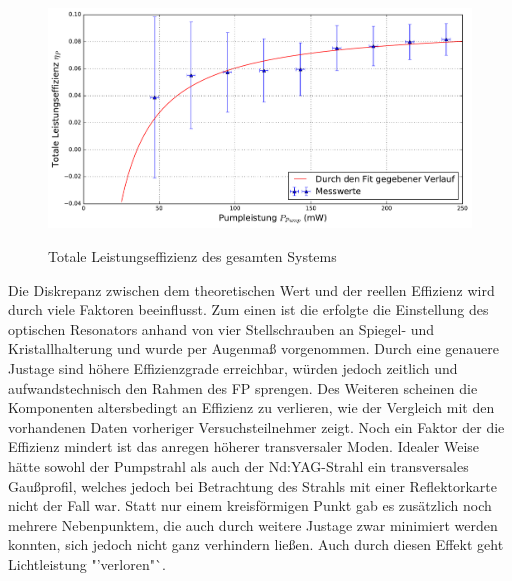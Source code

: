 \documentclass[twoside,colorback,accentcolor=tud4c,11pt]{tudreport}
\begin{document}
\begin{figure}[H]
\centering
   	\begin{minipage}[b]{0.9\textwidth}
   	\includegraphics[width=\textwidth]{graphics/tot_leisteff.pdf}
  	\label{toleist}
   	\end{minipage}
\caption{Totale Leistungseffizienz des gesamten Systems}	
\end{figure}
Die Diskrepanz zwischen dem theoretischen Wert und der reellen Effizienz wird durch viele Faktoren beeinflusst. Zum einen ist die erfolgte die Einstellung des optischen Resonators anhand von vier Stellschrauben an Spiegel- und Kristallhalterung und wurde per Augenmaß vorgenommen. Durch eine genauere Justage sind höhere Effizienzgrade erreichbar, würden jedoch zeitlich und aufwandstechnisch den Rahmen des FP sprengen. Des Weiteren scheinen die Komponenten altersbedingt an Effizienz zu verlieren, wie der Vergleich mit den vorhandenen Daten vorheriger Versuchsteilnehmer zeigt. Noch ein Faktor der die Effizienz mindert ist das anregen höherer transversaler Moden. Idealer Weise hätte sowohl der Pumpstrahl als auch der Nd:YAG-Strahl ein transversales Gaußprofil, welches jedoch bei Betrachtung des Strahls mit einer Reflektorkarte nicht der Fall war. Statt nur einem kreisförmigen Punkt gab es zusätzlich noch mehrere Nebenpunktem, die auch durch weitere Justage zwar minimiert werden konnten, sich jedoch nicht ganz verhindern ließen. Auch durch diesen Effekt geht Lichtleistung "'verloren"`.
\end{document}
